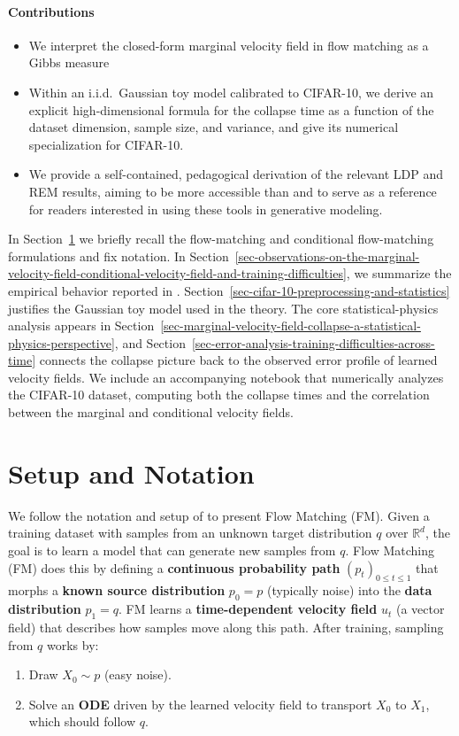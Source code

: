 \documentclass[11pt]{article}
\begin{document}
\paragraph{Contributions}
\begin{itemize}
\item We interpret the closed-form marginal velocity field in flow matching as a Gibbs measure
\item Within an i.i.d.\ Gaussian toy model calibrated to CIFAR-10, we derive an explicit high-dimensional formula for the collapse time as a function of the dataset dimension, sample size, and variance, and give its numerical specialization for CIFAR-10.
\item We provide a self-contained, pedagogical derivation of the relevant LDP and REM results, aiming to be more accessible than \cite{bertrand_closed-form_2025} and to serve as a reference for readers interested in using these tools in generative modeling.
\end{itemize}

\noindent In Section~\ref{sec-setup-and-notation} we briefly recall the flow-matching and conditional flow-matching formulations and fix notation. In Section~\ref{sec-observations-on-the-marginal-velocity-field-conditional-velocity-field-and-training-difficulties}, we summarize the empirical behavior reported in \cite{bertrand_closed-form_2025}. Section~\ref{sec-cifar-10-preprocessing-and-statistics} justifies the Gaussian toy model used in the theory. The core statistical-physics analysis appears in Section~\ref{sec-marginal-velocity-field-collapse-a-statistical-physics-perspective}, and Section~\ref{sec-error-analysis-training-difficulties-across-time} connects the collapse picture back to the observed error profile of learned velocity fields. We include an accompanying notebook that numerically analyzes the CIFAR-10 dataset, computing both the collapse times and the correlation between the marginal and conditional velocity fields.

\section{Setup and Notation}\label{sec-setup-and-notation}
We follow the notation and setup of \cite[Section~2]{lipman_flow_2024} to present Flow Matching (FM). Given a training dataset with samples from an unknown target distribution $q$ over $\mathbb{R}^d$, the goal is to learn a model that can generate new samples from $q$. Flow Matching (FM) does this by defining a \textbf{continuous probability path} $(p_t)_{0\le t\le 1}$ that morphs a \textbf{known source distribution} $p_0=p$ (typically noise) into the \textbf{data distribution} $p_1=q$. FM learns a \textbf{time-dependent velocity field} $u_t$ (a vector field) that describes how samples move along this path. After training, sampling from $q$ works by:
\begin{enumerate}
\item Draw $X_0 \sim p$ (easy noise).
\item Solve an \textbf{ODE} driven by the learned velocity field to transport $X_0$ to $X_1$, which should follow $q$.
\end{enumerate}
\end{document}
